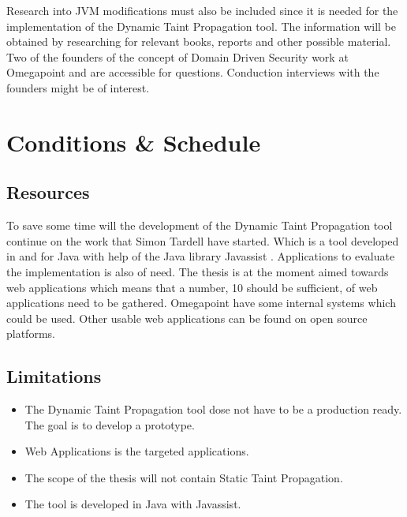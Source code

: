 \documentclass{../kththesis}
\begin{document}
\noindent
Research into JVM modifications must also be included since it is needed for the implementation of the Dynamic Taint Propagation tool. The information will be obtained by researching for relevant books, reports and other possible material. Two of the founders of the concept of Domain Driven Security work at Omegapoint and are accessible for questions. Conduction interviews with the founders might be of interest.



\chapter{Conditions \& Schedule}
\section{Resources}
To save some time will the development of the Dynamic Taint Propagation tool continue on the work that Simon Tardell have started. Which is a tool developed in and for Java with help of the Java library Javassist \parencite{javassist}. Applications to evaluate the implementation is also of need. The thesis is at the moment aimed towards web applications which means that a number, 10 should be sufficient, of web applications need to be gathered. Omegapoint have some internal systems which could be used. Other usable web applications can be found on open source platforms.


\section{Limitations}
\begin{itemize}  
	\item The Dynamic Taint Propagation tool dose not have to be a production ready. The goal is to develop a prototype.
	\item Web Applications is the targeted applications.
	\item The scope of the thesis will not contain Static Taint Propagation.
	\item The tool is developed in Java with Javassist.
\end{itemize}
\end{document}
